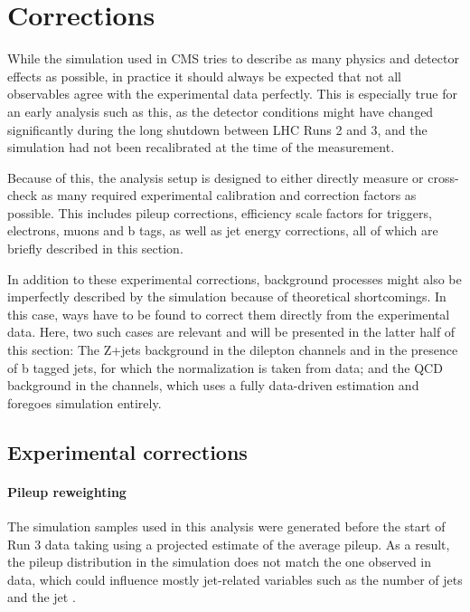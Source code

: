 \section{Corrections}
\label{sec:ttxs:corrections}

While the simulation used in CMS tries to describe as many physics and detector effects as possible, in practice it should always be expected that not all observables agree with the experimental data perfectly. This is especially true for an early analysis such as this, as the detector conditions might have changed significantly during the long shutdown between LHC Runs 2 and 3, and the simulation had not been recalibrated at the time of the measurement. 

Because of this, the analysis setup is designed to either directly measure or cross-check as many required experimental calibration and correction factors as possible. This includes pileup corrections, efficiency scale factors for triggers, electrons, muons and b tags, as well as jet energy corrections, all of which are briefly described in this section.

In addition to these experimental corrections, background processes might also be imperfectly described by the simulation because of theoretical shortcomings. In this case, ways have to be found to correct them directly from the experimental data. Here, two such cases are relevant and will be presented in the latter half of this section: The Z+jets background in the dilepton channels and in the presence of b tagged jets, for which the normalization is taken from data; and the QCD background in the \ljets channels, which uses a fully data-driven estimation and foregoes simulation entirely.

\subsection{Experimental corrections}
\label{sec:ttxs:scalefactors}

\paragraph{Pileup reweighting}

The simulation samples used in this analysis were generated before the start of Run 3 data taking using a projected estimate of the average pileup. As a result, the pileup distribution in the simulation does not match the one observed in data, which could influence mostly jet-related variables such as the number of jets and the jet \pt.

